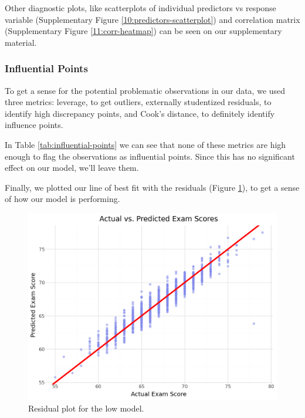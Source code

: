 \documentclass[twocolumn]{article} %
\begin{document}
Other diagnostic plots, like scatterplots of individual predictors vs response variable (Supplementary Figure \ref{10:predictors-scatterplot}) and correlation matrix (Supplementary Figure \ref{11:corr-heatmap}) can be seen on our supplementary material.

\subsubsection*{Influential Points}
To get a sense for the potential problematic observations in our data, we used three metrics: leverage, to get outliers, externally studentized residuals, to identify high discrepancy points, and Cook's distance, to definitely identify influence points.

In Table \ref{tab:influential-points} we can see that none of these metrics are high enough to flag the observations as influential points. Since this has no significant effect on our model, we'll leave them.

\begin{table}[H]
  \caption{Leverage, Cook's Distance, and Studentized Residual for Selected Observations}
  \label{tab:influential-points}
\end{table}

Finally, we plotted our line of best fit with the residuals (Figure \ref{17:obs-vs-fitted}), to get a sense of how our model is performing.

\begin{figure}[h]
  \includegraphics[width=\columnwidth]{17-observed-vs-fitted.png}
  \caption{Residual plot for the low model.}
  \label{17:obs-vs-fitted}
\end{figure}
\end{document}
